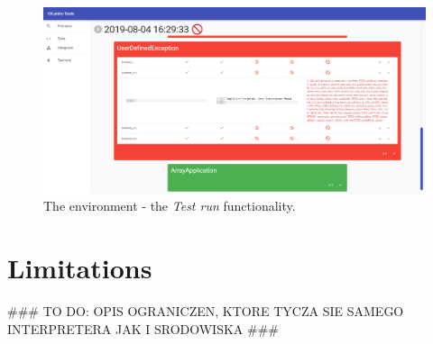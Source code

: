 \documentclass{article}
\numberwithin{equation}{section}
\begin{document}
\begin{figure}
	\includegraphics[width=1\textwidth]{tools_run.png}
    \centering
    \caption{The environment - the \textit{Test run} functionality.}
    \label{fig:tools_run}
\end{figure}

\clearpage


\section{Limitations}

\#\#\# TO DO: OPIS OGRANICZEN, KTORE TYCZA SIE SAMEGO INTERPRETERA JAK I SRODOWISKA \#\#\#

\clearpage


\renewcommand{\refname}{Bibliography}

{}


\end{document}
